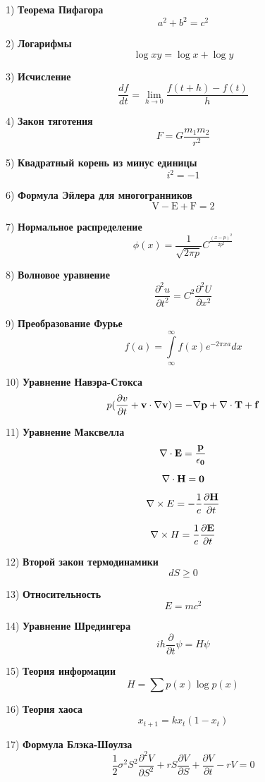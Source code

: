 \documentclass[a5paper,12pt]{book}[2018/02/23]
\begin{document}
1) \bf{Теорема Пифагора} 
$$a^2+b^2=c^2$$

2) \bf{Логарифмы} 
$$\log xy = \log x + \log y$$

3) \bf{Исчисление}
$$ \frac{df}{dt} = \lim \limits_{h\to 0} \frac{f(t+h)-f(t)}{h}$$

4) \bf{Закон тяготения}
$$ F = G\dfrac{m_{1} m_{2}}{r^2}$$

5) \bf{Квадратный корень из минус единицы}
$$i^{2} = -1$$

6) \bf{Формула Эйлера для многогранников}
$$\mathrm{V}-\mathrm{E}+\mathrm{F}=2$$

7) \bf{Нормальное распределение}
$$\phi \left(x\right)=\frac{1}{\sqrt{2\pi p}}{C}^{\frac{{\left(x-p\right)}^{2}}{2{p}^{2}}}$$

8) \bf{Волновое уравнение}
$$\frac{{\partial }^{2}u}{\partial {t}^{2}}={C}^{2}\frac{{\partial }^{2}U}{\partial {x}^{2}}$$

9) \bf{Преобразование Фурье}
$$f(a)=\underset{\infty }{\overset{\infty }{\int }}f\left(x\right){e}^{-2\pi xa}dx$$

10) \bf{Уравнение Навэра-Стокса}
$$p(\dfrac{\partial v}{\partial t}+\bf v \cdot \nabla \bf v) = - \nabla p + \nabla \cdot \bf T + \bf f $$

11) \bf{Уравнение Максвелла}
$$\nabla \cdot \bf E = \dfrac{p}{\epsilon_0} $$

$$ \nabla \cdot \bf H = 0$$

$$\nabla  \times E = - \dfrac{1}{e} \dfrac{\partial \bf H}{\partial t} $$

$$\nabla  \times H = \dfrac{1}{e} \dfrac{\partial \bf E}{\partial t} $$

12) \bf{Второй закон термодинамики}
$$dS\ge 0 $$

13) \bf{Относительность}
$$E=mc^2 $$

14) \bf{Уравнение Шредингера}
$$ih \dfrac{\partial}{\partial t} \psi = H \psi $$

15) \bf{Теория информации}
$$H = \sum p(x) \log p(x) $$

16) \bf{Теория хаоса}
$$x_{t+1}=kx_{t}(1-x_{t}) $$

17) \bf{Формула Блэка-Шоулза}
$$\dfrac{1}{2} \sigma^2 S^2 \dfrac{\partial^2 V}{\partial S^2} + rS \dfrac{\partial V}{\partial S} + \dfrac{\partial V}{\partial t} - rV = 0$$
\end{document}
